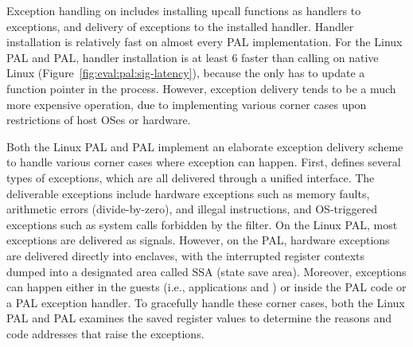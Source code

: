



Exception handling on \thehostabi{}
includes installing upcall functions as handlers to exceptions,
and delivery of exceptions to the installed handler.
Handler installation
is relatively fast on almost every PAL implementation.
For the Linux PAL and \sgx{} PAL,
handler installation
is at least 6\x{} faster than calling  on native Linux (Figure~\ref{fig:eval:pal:sig-latency}),
because the \hostapi{} only has to update a function pointer in the process.
However, exception delivery
tends to be a much more expensive operation,
due to implementing various corner cases
upon restrictions
of host OSes or hardware.




Both the Linux PAL and \sgx{} PAL implement
an elaborate exception delivery scheme
to handle various corner cases where exception can happen.
First, \thehostabi{}
defines several types of exceptions,
which are all delivered through a unified interface.
The deliverable exceptions
include hardware exceptions such as memory faults,
arithmetic errors (divide-by-zero), and illegal instructions,
and OS-triggered exceptions
such as system calls forbidden by the \seccomp{} filter.
On the Linux PAL,
most exceptions are delivered as signals.
However, on the \sgx{} PAL,
hardware exceptions are delivered directly into enclaves,
with the interrupted register contexts dumped
into a designated area called SSA (state save area).
Moreover, exceptions can happen
either in the guests (i.e., applications and \liboses{})
or inside the PAL code or a PAL exception handler.
To gracefully handle these corner cases,
both the Linux PAL and \sgx{} PAL examines the saved register values to determine the reasons and code addresses
that raise the exceptions.



